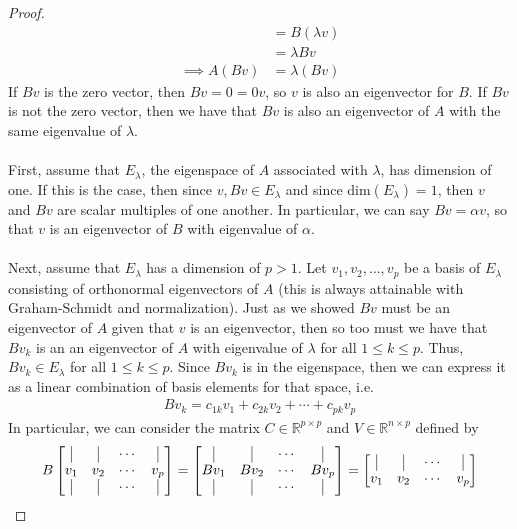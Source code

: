 \documentclass[10pt,a4paper]{article}
\theoremstyle{definition}
\theoremstyle{definition}
\numberwithin{equation}{section}
\begin{document}
\begin{proof}
\begin{align*}
&= B(\lambda v)\\
&= \lambda Bv\\
\implies A(Bv) &= \lambda (Bv)
\end{align*}
If $Bv$ is the zero vector, then $Bv = 0 = 0v$, so $v$ is also an eigenvector for $B$. If $Bv$ is not the zero vector, then we have that $Bv$ is also an eigenvector of $A$ with the same eigenvalue of $\lambda$.
\\
\\First, assume that $E_\lambda$, the eigenspace of $A$ associated with $\lambda$, has dimension of one. If this is the case, then since $v, Bv \in E_\lambda$ and since dim$(E_\lambda) = 1$, then $v$ and $Bv$ are scalar multiples of one another. In particular, we can say $Bv = \alpha v$, so that $v$ is an eigenvector of $B$ with eigenvalue of $\alpha$.
\\
\\Next, assume that $E_\lambda$ has a dimension of $p > 1$. Let $v_1, v_2, \ldots, v_p$ be a basis of $E_\lambda$ consisting of orthonormal eigenvectors of $A$ (this is always attainable with Graham-Schmidt and normalization). Just as we showed $Bv$ must be an eigenvector of $A$ given that $v$ is an eigenvector, then so too must we have that $Bv_k$ is an an eigenvector of $A$ with eigenvalue of $\lambda$ for all $1 \leq k \leq p$. Thus, $Bv_k \in E_\lambda$ for all $1 \leq k \leq p$. Since $Bv_k$ is in the eigenspace, then we can express it as a linear combination of basis elements for that space, i.e. 
\begin{align*}
Bv_k = c_{1k}v_1 + c_{2k}v_2 + \cdots + c_{pk}v_p
\end{align*}
In particular, we can consider the matrix $C \in \mathbb{R}^{p \times p}$ and $V \in \mathbb{R}^{n \times p}$ defined by
\begin{align*}
B \begin{bmatrix}
\vline & \vline & \cdots & \vline\\
v_1 & v_2 & \cdots & v_p\\
\vline & \vline & \cdots & \vline
\end{bmatrix} = \begin{bmatrix}
\vline & \vline & \cdots & \vline\\
Bv_1 & Bv_2 & \cdots & Bv_p\\
\vline & \vline & \cdots & \vline
\end{bmatrix} = \begin{bmatrix}
\vline & \vline & \cdots & \vline\\
v_1 & v_2 & \cdots & v_p\\

\end{bmatrix}
\end{align*}
\end{proof}
\end{document}
